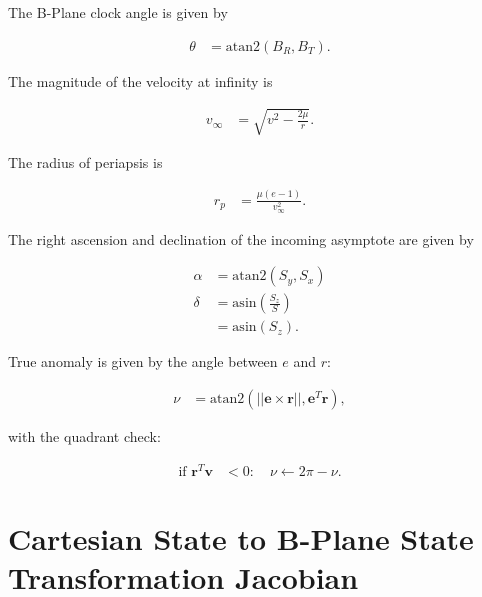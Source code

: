 \documentclass[]{article}
\newcommand{\vb}[1]{\bm{#1}} %
\newcommand{\vbh}[1]{\hat{\bm{#1}}} %
\begin{document}
\nomenclature{$B_R$}{$\vb{B}^T \vbh{R}$}
\nomenclature{$B_T$}{$\vb{B}^T \vbh{T}$}

\noindent The B-Plane clock angle is given by

\begin{align}
	\theta &= \mathrm{atan2} \left(B_R, B_T \right).
\end{align}

\noindent The magnitude of the velocity at infinity is

\begin{align}
	v_{\infty} &= \sqrt{v^2 - \frac{2 \mu}{r}}.
\end{align}

\noindent The radius of periapsis is

\begin{align}
	r_p &= \frac{\mu \left( e - 1 \right)}{v_{\infty}^2}.
\end{align}


\noindent The right ascension and declination of the incoming asymptote are given by

\begin{align}
	\alpha &= \mathrm{atan2} \left( S_y, S_x \right) \\
	\delta &= \mathrm{asin} \left( \frac{S_z}{S} \right) \\
	&= \mathrm{asin} \left( S_z \right).
\end{align}


\noindent True anomaly is given by the angle between $e$ and $r$:

\begin{align}
\label{eq:TA_from_xc}
	\nu &= \mathrm{atan2} \left( || \vb{e} \times \vb{r} ||, \vb{e}^T \vb{r} \right),
\end{align}

\noindent with the quadrant check:

\begin{align}
	\text{if } \vb{r}^T \vb{v} &< 0: \quad \nu \leftarrow 2 \pi - \nu.
\end{align}

\section{Cartesian State to B-Plane State Transformation Jacobian}
\label{sec:cartesian2bplanejac}
\end{document}
